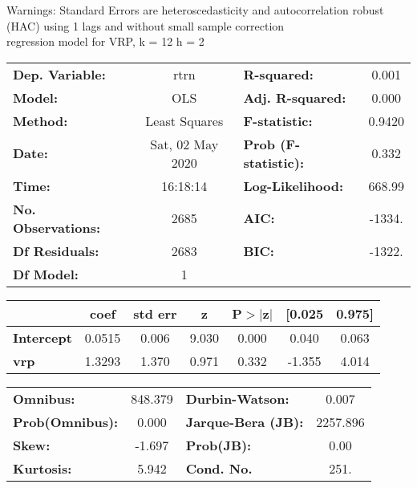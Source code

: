 Warnings: \newline
 [1] Standard Errors are heteroscedasticity and autocorrelation robust (HAC) using 1 lags and without small sample correction\\ 

regression model for VRP, k = 12 h = 2\begin{center}
\begin{tabular}{lclc}
\toprule
\textbf{Dep. Variable:}    &       rtrn       & \textbf{  R-squared:         } &     0.001   \\
\textbf{Model:}            &       OLS        & \textbf{  Adj. R-squared:    } &     0.000   \\
\textbf{Method:}           &  Least Squares   & \textbf{  F-statistic:       } &    0.9420   \\
\textbf{Date:}             & Sat, 02 May 2020 & \textbf{  Prob (F-statistic):} &    0.332    \\
\textbf{Time:}             &     16:18:14     & \textbf{  Log-Likelihood:    } &    668.99   \\
\textbf{No. Observations:} &        2685      & \textbf{  AIC:               } &    -1334.   \\
\textbf{Df Residuals:}     &        2683      & \textbf{  BIC:               } &    -1322.   \\
\textbf{Df Model:}         &           1      & \textbf{                     } &             \\
\bottomrule
\end{tabular}
\begin{tabular}{lcccccc}
                   & \textbf{coef} & \textbf{std err} & \textbf{z} & \textbf{P$> |$z$|$} & \textbf{[0.025} & \textbf{0.975]}  \\
\midrule
\textbf{Intercept} &       0.0515  &        0.006     &     9.030  &         0.000        &        0.040    &        0.063     \\
\textbf{vrp}       &       1.3293  &        1.370     &     0.971  &         0.332        &       -1.355    &        4.014     \\
\bottomrule
\end{tabular}
\begin{tabular}{lclc}
\textbf{Omnibus:}       & 848.379 & \textbf{  Durbin-Watson:     } &    0.007  \\
\textbf{Prob(Omnibus):} &   0.000 & \textbf{  Jarque-Bera (JB):  } & 2257.896  \\
\textbf{Skew:}          &  -1.697 & \textbf{  Prob(JB):          } &     0.00  \\
\textbf{Kurtosis:}      &   5.942 & \textbf{  Cond. No.          } &     251.  \\
\bottomrule
\end{tabular}
\end{center}

